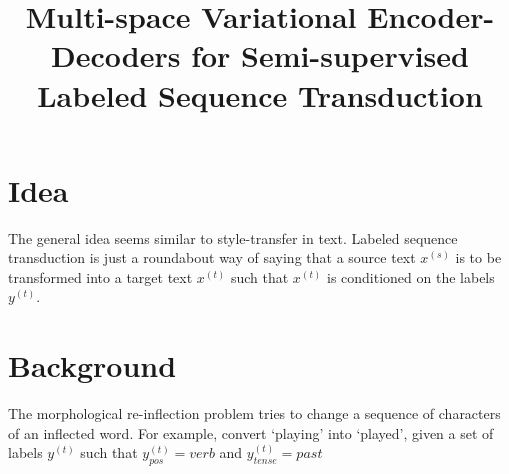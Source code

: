 \documentclass[12pt]{article}
\begin{document}
\title{Multi-space Variational Encoder-Decoders for Semi-supervised Labeled Sequence Transduction}
\author{}
\date{}
\maketitle

\section{Idea}
  The general idea seems similar to style-transfer in text. Labeled sequence transduction is just a roundabout way of saying that a source text $x^{(s)}$ is to be transformed into a target text $x^{(t)}$ such that $x^{(t)}$ is conditioned on the labels $y^{(t)}$.

\section{Background}
  The morphological re-inflection problem tries to change a sequence of characters of an inflected word. For example, convert `playing' into `played', given a set of labels $y^{(t)}$ such that $y^{(t)}_{pos}=verb$ and $y^{(t)}_{tense}=past$
\end{document}
